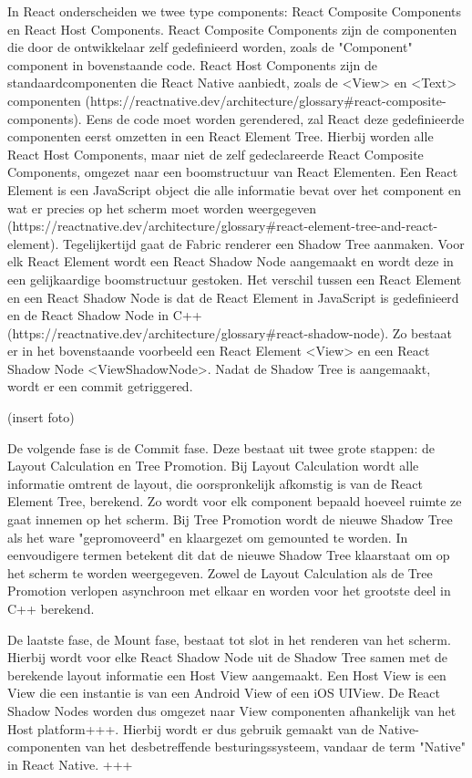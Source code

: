 In React onderscheiden we twee type components: React Composite Components en React Host Components. React Composite Components zijn de componenten die door de ontwikkelaar zelf gedefinieerd worden, zoals de "Component" component in bovenstaande code. React Host Components zijn de standaardcomponenten die React Native aanbiedt, zoals de <View> en <Text> componenten (https://reactnative.dev/architecture/glossary#react-composite-components). Eens de code moet worden gerendered, zal React deze gedefinieerde componenten eerst omzetten in een React Element Tree. Hierbij worden alle React Host Components, maar niet de zelf gedeclareerde React Composite Components, omgezet naar een boomstructuur van React Elementen. Een React Element is een JavaScript object die alle informatie bevat over het component en wat er precies op het scherm moet worden weergegeven (https://reactnative.dev/architecture/glossary#react-element-tree-and-react-element). Tegelijkertijd gaat de Fabric renderer een Shadow Tree aanmaken. Voor elk React Element wordt een React Shadow Node aangemaakt en wordt deze in een gelijkaardige boomstructuur gestoken. Het verschil tussen een React Element en een React Shadow Node is dat de React Element in JavaScript is gedefinieerd en de React Shadow Node in C++ (https://reactnative.dev/architecture/glossary#react-shadow-node). Zo bestaat er in het bovenstaande voorbeeld een React Element <View> en een React Shadow Node <ViewShadowNode>. Nadat de Shadow Tree is aangemaakt, wordt er een commit getriggered.

(insert foto)

De volgende fase is de Commit fase. Deze bestaat uit twee grote stappen: de Layout Calculation en Tree Promotion. Bij Layout Calculation wordt alle informatie omtrent de layout, die oorspronkelijk afkomstig is van de React Element Tree, berekend. Zo wordt voor elk component bepaald hoeveel ruimte ze gaat innemen op het scherm. Bij Tree Promotion wordt de nieuwe Shadow Tree als het ware "gepromoveerd" en klaargezet om gemounted te worden. In eenvoudigere termen betekent dit dat de nieuwe Shadow Tree klaarstaat om op het scherm te worden weergegeven. Zowel de Layout Calculation als de Tree Promotion verlopen asynchroon met elkaar en worden voor het grootste deel in C++ berekend.

De laatste fase, de Mount fase, bestaat tot slot in het renderen van het scherm. Hierbij wordt voor elke React Shadow Node uit de Shadow Tree samen met de berekende layout informatie een Host View aangemaakt. Een Host View is een View die een instantie is van een Android View of een iOS UIView. De React Shadow Nodes worden dus omgezet naar View componenten afhankelijk van het Host platform+++. Hierbij wordt er dus gebruik gemaakt van de Native-componenten van het desbetreffende besturingssysteem, vandaar de term "Native" in React Native.
+++

